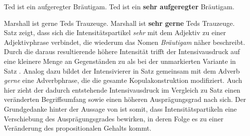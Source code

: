 \ea   \label{hochzeit0}
\ea Ted ist ein aufgeregter Bräutigam. \label{braut0}
\ex Ted ist ein \textbf{sehr aufgeregter} Bräutigam. \label{braut}
\z
\z

\ea   \label{hochzeit02}
\ea Marshall ist gerne Teds Trauzeuge. \label{trau0}
\ex Marshall ist \textbf{sehr gerne} Teds Trauzeuge. \label{trau}
 \z
 \z
Satz  zeigt, dass sich die Intensitätspartikel \textit{sehr} mit dem Adjektiv zu einer Adjektivphrase verbindet, die wiederum das Nomen \textit{Bräutigam} näher beschreibt. Durch die daraus resultierende höhere Intensität trifft der Intensivausdruck auf eine kleinere Menge an Gegenständen zu als bei der unmarkierten Variante in Satz . Analog dazu bildet der Intensivierer {in Satz } gemeinsam mit dem Adverb \textit{gerne} eine Adverbphrase, die die gesamte Kopulakonstruktion modifiziert. Auch hier zieht der dadurch entstehende Intensivausdruck im Vergleich zu Satz  einen veränderten Begriffsumfang sowie einen höheren Ausprägungsgrad nach sich. Der Grundgedanke hinter der Aussage von {\citet[987f.]{Zifonun.1997}} ist somit, dass Intensitätspartikeln eine Verschiebung des Ausprägungsgrades bewirken, in deren Folge es zu einer Veränderung des propositionalen Gehalts kommt.


